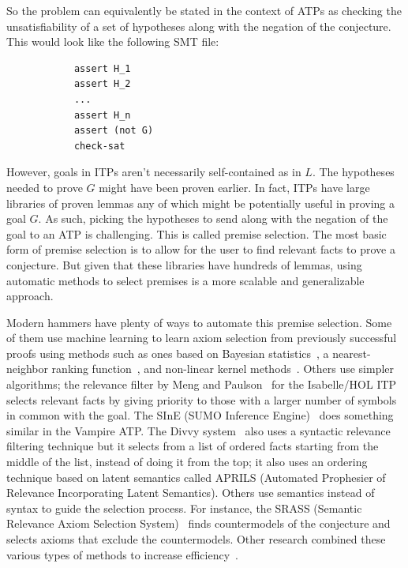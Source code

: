 \documentclass{article}
\begin{document}
		So the problem can equivalently be stated in the context of ATPs
		as checking the unsatisfiability of a set of hypotheses 
		along with the negation of the conjecture. This would look 
		like the following SMT file:
		\begin{verbatim}
			assert H_1
			assert H_2
			...
			assert H_n
			assert (not G)
			check-sat
		\end{verbatim}
		However, goals in ITPs aren't necessarily self-contained 
		as in $L$. The hypotheses needed to prove $G$ 
		might have been proven earlier. In fact, ITPs have large
		libraries of proven lemmas any of which might be potentially 
		useful in proving a goal $G$. As such, picking
		the hypotheses to send along with the negation of the 
		goal to an ATP is challenging. This is called premise 
		selection. The most basic form of premise selection 
		is to allow for the user to find relevant facts 
		to prove a conjecture. But given that these libraries 
		have hundreds of lemmas, using automatic methods 
		to select premises is a more scalable and 
		generalizable approach.
	
		Modern hammers have plenty of ways to 
		automate this premise selection. Some of them use 
		machine learning to learn axiom selection from 
		previously successful proofs using methods such as 
		ones based on Bayesian 
		statistics~\cite{DBLP:journals/jar/AlamaHKTU14}, 
		a nearest-neighbor ranking 
		function~\cite{DBLP:conf/cade/KaliszykU13a}, and
		non-linear kernel
		methods~\cite{DBLP:journals/jar/AlamaHKTU14}.
		Others use simpler algorithms; the relevance filter 
		by Meng and Paulson~\cite{DBLP:journals/japll/MengP09}
		for the Isabelle/HOL ITP selects relevant facts by 
		giving priority to those with a larger number of 
		symbols in common with the goal. The SInE 
		(SUMO Inference 
		Engine)~\cite{10.1007/978-3-642-22438-6_23} does
		something similar in the Vampire ATP. The Divvy 
		system~\cite{10.1007/978-3-642-02959-2_13} also 
		uses a syntactic relevance filtering technique but 
		it selects from a list of ordered facts 
		starting from the middle of the list, instead of 
		doing it from the top; it also uses an ordering 
		technique based on latent semantics called 
		APRILS (Automated Prophesier of Relevance 
		Incorporating Latent Semantics). Others use 
		semantics instead of syntax to guide the 
		selection process. For instance, the SRASS 
		(Semantic Relevance Axiom Selection 
		System)~\cite{10.1007/978-3-540-73595-3_20} 
		finds countermodels of the conjecture and selects 
		axioms that	exclude the countermodels. Other research combined these various types of methods to increase efficiency~\cite{DBLP:journals/corr/KaliszykU13b, 
		10.1007/978-3-642-31365-3_30}.
		
\end{document}
